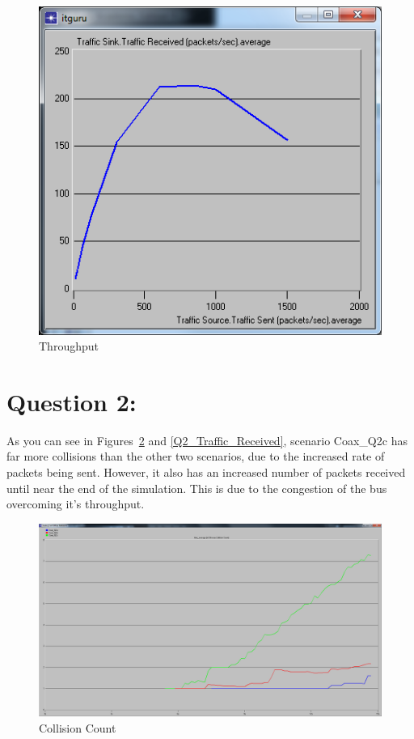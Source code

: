 \documentclass[letter,12pt]{article}
\begin{document}
	\begin{figure}[h!]
		\centering
			\includegraphics[scale=.6]{Throughput.png}
		\caption{Throughput}
		\label{Throughput}
	\end{figure}
	
\pagebreak

\section{Question 2:}
	As you can see in Figures~\ref{Collision_Count} and \ref{Q2_Traffic_Received}, scenario Coax\_Q2c has far more collisions than the other two scenarios, due to the increased rate of packets being sent.  However, it also has an increased number of packets received until near the end of the simulation.  This is due to the congestion of the bus overcoming it's throughput.
	
	\begin{figure}[h!]
		\centering
			\includegraphics[width=.8\textwidth]{Collision_Count.png}
		\caption{Collision Count}
		\label{Collision_Count}
	\end{figure}
	
\end{document}
